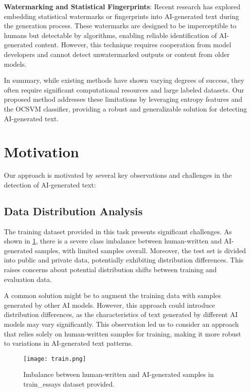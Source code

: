 \textbf{Watermarking and Statistical Fingerprints}: Recent research has explored embedding statistical watermarks or fingerprints into AI-generated text during the generation process. These watermarks are designed to be imperceptible to humans but detectable by algorithms, enabling reliable identification of AI-generated content. However, this technique requires cooperation from model developers and cannot detect unwatermarked outputs or content from older models.

In summary, while existing methods have shown varying degrees of success, they often require significant computational resources and large labeled datasets. Our proposed method addresses these limitations by leveraging entropy features and the OCSVM classifier, providing a robust and generalizable solution for detecting AI-generated text.

\section{Motivation}
\label{Motivation}

Our approach is motivated by several key observations and challenges in the detection of AI-generated text:

\subsection{Data Distribution Analysis}
The training dataset provided in this task presents significant challenges. As shown in \cref{train}, there is a severe class imbalance between human-written and AI-generated samples, with limited samples overall. Moreover, the test set is divided into public and private data, potentially exhibiting distribution differences. This raises concerns about potential distribution shifts between training and evaluation data.

A common solution might be to augment the training data with samples generated by other AI models. However, this approach could introduce distribution differences, as the characteristics of text generated by different AI models may vary significantly. This observation led us to consider an approach that relies solely on human-written samples for training, making it more robust to variations in AI-generated text patterns.


\begin{figure}[t]
\begin{center}
\centerline{\texttt{[image: train.png]}}

\caption{Imbalance between human-written and AI-generated samples in train\_essays dataset provided.}

\label{train}
\end{center}
\vskip -0.2in
\end{figure}

